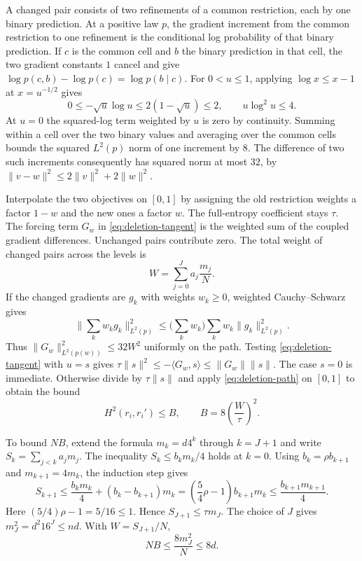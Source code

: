 \documentclass[11pt]{article}
\theoremstyle{definition}\newtheorem{definition}[theorem]{Definition}
\begin{document}
A changed pair consists of two refinements of a common restriction, each by
one binary prediction. At a positive law $p$, the gradient increment from
the common restriction to one refinement is the conditional log probability
of that binary prediction. If $c$ is the common cell and $b$ the binary
prediction in that cell, the two gradient constants $1$ cancel and give
$\log p(c,b)-\log p(c)=\log p(b\mid c)$. For $0<u\le1$, applying $\log x\le x-1$ at $x=u^{-1/2}$ gives
\[
  0\le -\sqrt u\log u
       \le 2(1-\sqrt u)\le2,
  \qquad u\log^2u\le4.
\]
At $u=0$ the squared-log term weighted by $u$ is zero by continuity. Summing
within a cell over the two binary values and averaging over the common cells
bounds the squared $L^2(p)$ norm of one increment by $8$. The difference of
two such increments consequently has squared norm at most $32$, by
$\|v-w\|^2\le2\|v\|^2+2\|w\|^2$.

Interpolate the two objectives on $[0,1]$ by assigning the old restriction
weights a factor $1-w$ and the new ones a factor $w$. The full-entropy
coefficient stays $\tau$. The forcing term $G_w$ in
\eqref{eq:deletion-tangent} is the weighted sum of the coupled gradient
differences. Unchanged pairs contribute zero. The total weight of changed
pairs across the levels is
\[
  W=\sum_{j=0}^J a_j\frac{m_j}{N}.
\]
If the changed gradients are $g_k$ with weights $w_k\ge0$, weighted
Cauchy--Schwarz gives
\[
 \Big\|\sum_k w_k g_k\Big\|_{L^2(p)}^2
 \le \Big(\sum_k w_k\Big)\sum_k w_k\|g_k\|_{L^2(p)}^2 .
\]
Thus $\|G_w\|_{L^2(p(w))}^2\le32W^2$ uniformly on the path. Testing
\eqref{eq:deletion-tangent} with $u=s$ gives
$\tau\|s\|^2\le-\langle G_w,s\rangle\le\|G_w\|\|s\|$. The case $s=0$ is
immediate. Otherwise divide by $\tau\|s\|$ and apply
\eqref{eq:deletion-path} on $[0,1]$ to obtain the bound
\begin{equation}
  H^2(r_i,r_i')\le B,
  \qquad B=8\left(\frac{W}{\tau}\right)^2.
  \label{eq:deletion-restriction-cost}
\end{equation}

To bound $NB$, extend the formula $m_k=d4^k$ through $k=J+1$ and write
$S_k=\sum_{j<k}a_jm_j$. The inequality $S_k\le b_km_k/4$ holds at $k=0$.
Using $b_k=\rho b_{k+1}$ and $m_{k+1}=4m_k$, the induction step gives
\[
  S_{k+1}\le\frac{b_km_k}{4}+(b_k-b_{k+1})m_k
     =\left(\frac54\rho-1\right)b_{k+1}m_k
     \le\frac{b_{k+1}m_{k+1}}4.
\]
Here $(5/4)\rho-1=5/16\le1$. Hence $S_{J+1}\le\tau m_J$.
The choice of $J$ gives $m_J^2=d^2 16^J\le nd$. With $W=S_{J+1}/N$,
\begin{equation}
  NB\le \frac{8m_J^2}{N}\le 8d.
  \label{eq:deletion-restriction-budget}
\end{equation}
\end{document}
